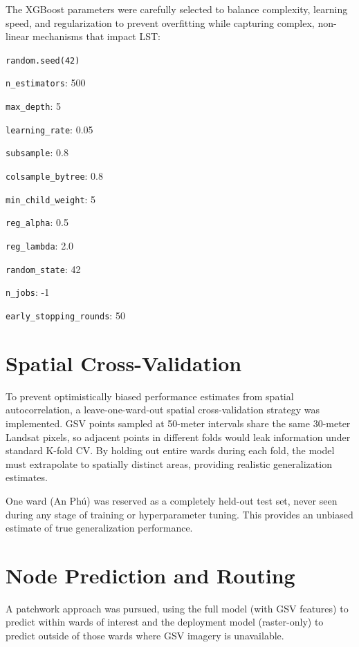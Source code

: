\documentclass[
]{report}
\begin{document}
The XGBoost parameters were carefully selected to balance complexity,
learning speed, and regularization to prevent overfitting while
capturing complex, non-linear mechanisms that impact LST:

\texttt{random.seed(42)}

\texttt{n\_estimators}: 500

\texttt{max\_depth}: 5

\texttt{learning\_rate}: 0.05

\texttt{subsample}: 0.8

\texttt{colsample\_bytree}: 0.8

\texttt{min\_child\_weight}: 5

\texttt{reg\_alpha}: 0.5

\texttt{reg\_lambda}: 2.0

\texttt{random\_state}: 42

\texttt{n\_jobs}: -1

\texttt{early\_stopping\_rounds}: 50

\section{Spatial Cross-Validation}\label{spatial-cross-validation}

To prevent optimistically biased performance estimates from spatial
autocorrelation, a leave-one-ward-out spatial cross-validation strategy
was implemented. GSV points sampled at 50-meter intervals share the same
30-meter Landsat pixels, so adjacent points in different folds would
leak information under standard K-fold CV. By holding out entire wards
during each fold, the model must extrapolate to spatially distinct
areas, providing realistic generalization estimates.

One ward (An Phú) was reserved as a completely held-out test set, never
seen during any stage of training or hyperparameter tuning. This
provides an unbiased estimate of true generalization performance.

\section{Node Prediction and Routing}\label{node-prediction-and-routing}

A patchwork approach was pursued, using the full model (with GSV
features) to predict within wards of interest and the deployment model
(raster-only) to predict outside of those wards where GSV imagery is
unavailable.
\end{document}
